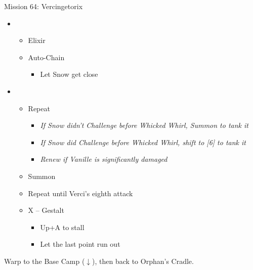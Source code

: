 \begin{battle}{Mission 64: Vercingetorix}
\begin{itemize}
		\item \third
			\begin{itemize}
				\item Elixir
				\item Auto-Chain
					\begin{itemize}
						\item Let Snow get close
					\end{itemize}
			\end{itemize}
		\item \second
			\begin{itemize}
				\item Repeat
					\begin{itemize}
						\item \textit{If Snow didn't Challenge before Whicked Whirl, Summon to tank it}
						\item \textit{If Snow did Challenge before Whicked Whirl, shift to [6] to tank it}
						\item \textit{Renew if Vanille is significantly damaged}
					\end{itemize}
				\item Summon
				\item Repeat until Verci's eighth attack
				\item X -- Gestalt
					\begin{itemize}
						\item Up+A to stall
						\item Let the last point run out
					\end{itemize}
			\end{itemize}
	\end{itemize}
\end{battle}

Warp to the Base Camp ($\downarrow$), then back to Orphan's Cradle.
